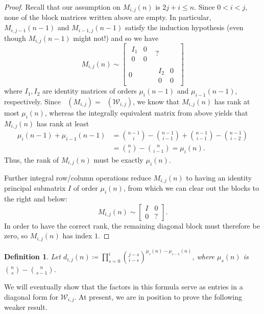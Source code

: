 \documentclass[11pt]{article}
\newtheorem{definition}[theo]{Definition}
\theoremstyle{definition}
\numberwithin{equation}{section}
\numberwithin{equation}{section}
\DeclareMathOperator{\rowq}{row_{\mathbb{Q}}}
\newcommand{\W}{\mathcal{W}}
\begin{document}
\begin{proof}
Recall that our assumption on $M_{i,j}(n)$ is $2j+i \leq n$.  Since $0<i<j$, none of the block matrices written above are empty.  In particular, $M_{i,j-1}(n-1)$ and $M_{i-1,j}(n-1)$ satisfy the induction hypothesis (even though $M_{i,j}(n-1)$ might not!) and so we have 
\[
M_{i,j}(n) \sim \left [ \begin{array}{c|c}
\begin{array}{c|c}
I_1 & 0 \\
\hline
0 & 0
\end{array} & 
? \\
\hline
0 & \begin{array}{c|c}
I_2 & 0 \\
\hline
0 & 0
\end{array}
\end{array} \right ]
\]
where $I_1, I_2$ are identity matrices of orders $\mu_{i}(n-1)$ and $\mu_{i-1}(n-1)$, respectively.  Since $\rowq(M_{i,j}) = \rowq(\W_{i,j})$, we know that $M_{i,j}(n)$ has rank at most $\mu_{i}(n)$, whereas the integrally equivalent matrix from above yields that $M_{i,j}(n)$ has rank at least 
\begin{align*}
\mu_{i}(n-1) + \mu_{i-1}(n-1) &=  \binom{n-1}{i} - \binom{n-1}{i-1} + \binom{n-1}{i-1} - \binom{n-1}{i-2} \\
&= \binom{n}{i} - \binom{n}{i-1} = \mu_{i}(n).
\end{align*}
Thus, the rank of $M_{i,j}(n)$ must be exactly $\mu_{i}(n)$.  

Further integral row/column operations reduce $M_{i,j}(n)$ to having an identity principal submatrix $I$ of order $\mu_{i}(n)$, from which we can clear out the blocks to the right and below:
\[ M_{i,j}(n) \sim \left [ \begin{array}{c|c}
I & 0 \\
\hline
0 & ?
\end{array} \right ]. \] 
In order to have the correct rank, the remaining diagonal block must therefore be zero, so $M_{i,j}(n)$ has index $1$.
\end{proof}



\begin{definition}
Let $d_{i,j}(n) \coloneqq  \prod_{s=0}^{i} \binom{j-s}{i-s}^{\mu_{s}(n) - \mu_{s-1}(n)}$, where $\mu_{s}(n)$ is \mbox{$\binom{n}{s} - \binom{n}{s-1}$}.
\end{definition}

We will eventually show that the factors in this formula serve as entries in a diagonal form for $\W_{i,j}$.  At present, we are in position to prove the following weaker result.
\end{document}
